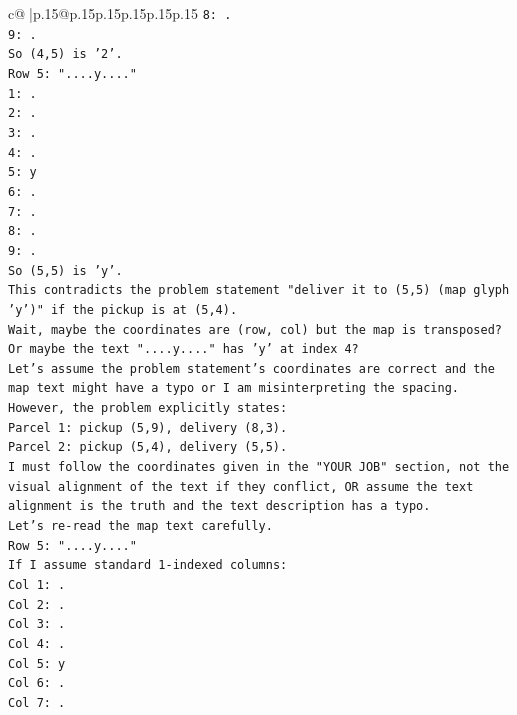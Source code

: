 \documentclass{article}
\begin{document}
{\begin{supertabular}{c@{$\;$}|p{.15\linewidth}@{}p{.15\linewidth}p{.15\linewidth}p{.15\linewidth}p{.15\linewidth}p{.15\linewidth}}
{{{\texttt{8: .} \\
\texttt{9: .} \\
\texttt{So (4,5) is '2'.} \\
\texttt{Row 5: "....y...."} \\
\texttt{1: .} \\
\texttt{2: .} \\
\texttt{3: .} \\
\texttt{4: .} \\
\texttt{5: y} \\
\texttt{6: .} \\
\texttt{7: .} \\
\texttt{8: .} \\
\texttt{9: .} \\
\texttt{So (5,5) is 'y'.} \\
\texttt{This contradicts the problem statement "deliver it to (5,5) (map glyph 'y')" if the pickup is at (5,4).} \\
\texttt{Wait, maybe the coordinates are (row, col) but the map is transposed?} \\
\texttt{Or maybe the text "....y...." has 'y' at index 4?} \\
\texttt{Let's assume the problem statement's coordinates are correct and the map text might have a typo or I am misinterpreting the spacing.} \\
\texttt{However, the problem explicitly states:} \\
\texttt{Parcel 1: pickup (5,9), delivery (8,3).} \\
\texttt{Parcel 2: pickup (5,4), delivery (5,5).} \\
\texttt{I must follow the coordinates given in the "YOUR JOB" section, not the visual alignment of the text if they conflict, OR assume the text alignment is the truth and the text description has a typo.} \\
\texttt{Let's re{-}read the map text carefully.} \\
\texttt{Row 5: "....y...."} \\
\texttt{If I assume standard 1{-}indexed columns:} \\
\texttt{Col 1: .} \\
\texttt{Col 2: .} \\
\texttt{Col 3: .} \\
\texttt{Col 4: .} \\
\texttt{Col 5: y} \\
\texttt{Col 6: .} \\
\texttt{Col 7: .} \\
}}}
\end{supertabular}}
\end{document}
